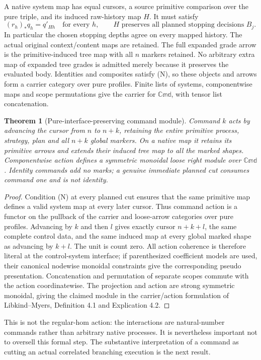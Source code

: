 \documentclass{article}
\newtheorem{theorem}{Theorem}\newtheorem{proposition}[theorem]{Proposition}
\begin{document}
A native system map has equal cursors, a source primitive comparison over the
pure triple, and its induced raw-history map $H$. It must satisfy
\[
 (r_h)_*q_h=q'_{Hh}\quad\text{for every }h,
 \qquad H\text{ preserves all planned stopping decisions }B_j.
 \tag{N}
\]
In particular the chosen stopping depths agree on every mapped history.
The actual original context/content maps are retained. The full expanded
grade arrow is the primitive-induced tree map with all $n$ markers retained.
No arbitrary extra map of expanded tree grades is admitted merely because it
preserves the evaluated body. Identities and composites satisfy (N), so these
objects and arrows form a carrier category over pure profiles. Finite lists
of systems, componentwise maps and scope permutations give the carrier for
$\mathbb{Cmd}$, with tensor list concatenation.

\begin{theorem}[Pure-interface-preserving command module]
Command $k$ acts by advancing the cursor from $n$ to $n+k$, retaining the
entire primitive process, strategy, plan and all $n+k$ global markers. On a
native map it retains its primitive arrows and extends their induced tree map
to all the marked shapes. Componentwise action defines a symmetric monoidal
loose right module over $\mathbb{Cmd}$. Identity commands add no marks;
a genuine immediate planned cut consumes command one and is not identity.
\end{theorem}
\begin{proof}
Condition (N) at every planned cut ensures that the same primitive map defines
a valid system map at every later cursor. Thus command action is a functor
on the pullback of the carrier and loose-arrow categories over pure profiles.
Advancing by $k$ and then $l$ gives exactly cursor $n+k+l$, the same complete
control data, and the same induced map at every global marked shape as
advancing by $k+l$. The unit is count zero. All action coherence is therefore
literal at the control-system interface; if parenthesized coefficient models
are used, their canonical nodewise monoidal constraints give the corresponding
pseudo presentation. Concatenation and permutation of separate scopes commute
with the action coordinatewise. The projection and action are strong symmetric
monoidal, giving the claimed module in the carrier/action formulation of
Libkind--Myers, Definition 4.1 and Explication 4.2.
\end{proof}
This is not the regular-hom action: the interactions are natural-number
commands rather than arbitrary native processes. It is nevertheless important
not to oversell this formal step. The substantive interpretation of a command
as cutting an actual correlated branching execution is the next result.
\end{document}
